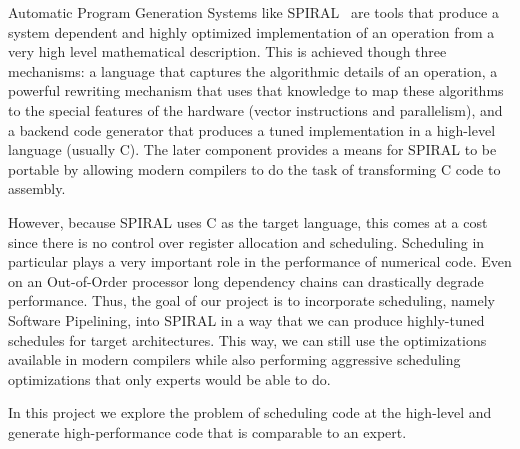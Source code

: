 \documentclass[10pt]{article}
\begin{document}
Automatic Program Generation Systems like SPIRAL~\cite{Pueschel:05} are tools that produce a system
dependent and highly optimized implementation of an operation from a very high level mathematical description. 
This is achieved though three mechanisms: a language that captures the algorithmic details of an operation, a powerful
rewriting mechanism that uses that knowledge to map these algorithms to the special features of the hardware (vector
instructions and parallelism), and a backend code generator that produces a tuned implementation in a high-level language
(usually C). The later component provides a means for SPIRAL to be portable by allowing modern compilers to do the task
of transforming C code to assembly.

However, because SPIRAL uses C as the target language, this comes at a cost since there is no control over register allocation and
scheduling. Scheduling in particular plays a very important role in the performance of numerical code. Even on an Out-of-Order
processor long dependency chains can drastically degrade performance. Thus, the goal of our project is to incorporate scheduling,
namely Software Pipelining, into SPIRAL in a way that we can produce highly-tuned schedules for target architectures.
This way, we can still use the optimizations available in modern compilers while also performing aggressive scheduling optimizations
that only experts would be able to do.

In this project we explore the problem of scheduling code at the high-level and generate high-performance code that is comparable
to an expert.
\end{document}
